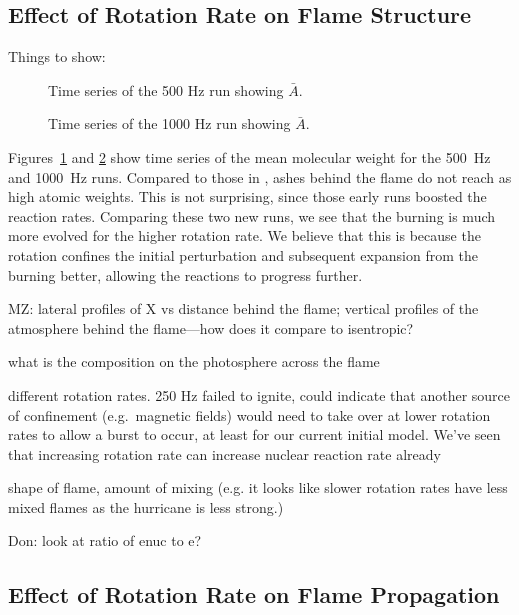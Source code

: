 \documentclass[preprint,times,tighten]{aastex63}
\begin{document}
\subsection{Effect of Rotation Rate on Flame Structure}\label{ssec:rot_structure}

Things to show:

\begin{figure}[t]
\centering
{}
\caption{\label{fig:time_series_500} Time series of the 500 Hz run showing $\bar{A}$.}
\end{figure}

\begin{figure}[t]
\centering
{}
\caption{\label{fig:time_series_1000} Time series of the 1000 Hz run showing $\bar{A}$.}
\end{figure}


Figures~\ref{fig:time_series_500} and \ref{fig:time_series_1000} show
time series of the mean molecular weight for the 500~Hz and 1000~Hz
runs.  Compared to those in \cite{flame_wave1}, ashes behind the flame
do not reach as high atomic weights.  This is not surprising, since
those early runs boosted the reaction rates.  Comparing these two new
runs, we see that the burning is much more evolved for the higher
rotation rate.  We believe that this is because the rotation confines
the initial perturbation and subsequent expansion from the burning
better, allowing the reactions to progress further.

MZ: lateral profiles of X vs distance behind the flame; 
vertical profiles of the atmosphere behind the flame---how does it compare to isentropic?

what is the composition on the photosphere across the flame

different rotation rates. 250 Hz failed to ignite, could indicate that another source of confinement (e.g.\ magnetic fields) would need to take
over at lower rotation rates to allow a burst to occur, at least for our current initial model. We've seen that increasing rotation rate can
increase nuclear reaction rate already

shape of flame, amount of mixing (e.g. it looks like slower rotation rates have less mixed flames as the hurricane is less strong.)

Don: look at ratio of enuc to e?

\subsection{Effect of Rotation Rate on Flame Propagation}\label{ssec:rot_propagation}
\end{document}

